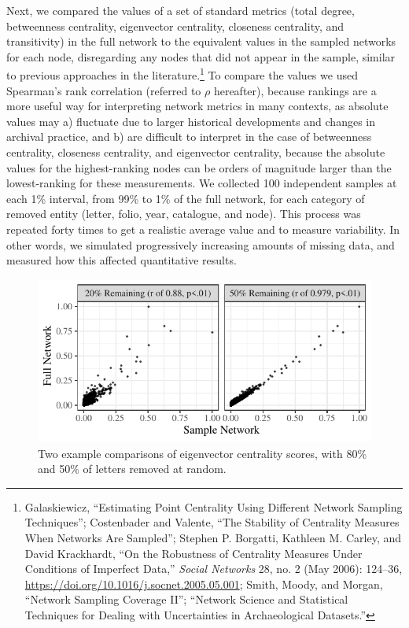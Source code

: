 \documentclass[]{article}
\begin{document}
Next, we compared the values of a set of standard metrics (total degree, betweenness centrality, eigenvector centrality, closeness centrality, and transitivity) in the full network to the equivalent values in the sampled networks for each node, disregarding any nodes that did not appear in the sample, similar to previous approaches in the literature.\footnote{Galaskiewicz, ``Estimating Point Centrality Using Different Network Sampling Techniques''; Costenbader and Valente, ``The Stability of Centrality Measures When Networks Are Sampled''; Stephen P. Borgatti, Kathleen M. Carley, and David Krackhardt, ``On the Robustness of Centrality Measures Under Conditions of Imperfect Data,'' \emph{Social Networks} 28, no. 2 (May 2006): 124--36, \url{https://doi.org/10.1016/j.socnet.2005.05.001}; Smith, Moody, and Morgan, ``Network Sampling Coverage II''; ``Network Science and Statistical Techniques for Dealing with Uncertainties in Archaeological Datasets.''} To compare the values we used Spearman's rank correlation (referred to \(\rho\) hereafter), because rankings are a more useful way for interpreting network metrics in many contexts, as absolute values may a) fluctuate due to larger historical developments and changes in archival practice, and b) are difficult to interpret in the case of betweenness centrality, closeness centrality, and eigenvector centrality, because the absolute values for the highest-ranking nodes can be orders of magnitude larger than the lowest-ranking for these measurements. We collected 100 independent samples at each 1\% interval, from 99\% to 1\% of the full network, for each category of removed entity (letter, folio, year, catalogue, and node). This process was repeated forty times to get a realistic average value and to measure variability. In other words, we simulated progressively increasing amounts of missing data, and measured how this affected quantitative results.

\begin{figure}
\centering
\includegraphics{network_robustness_article_anon_files/figure-latex/example-1.pdf}
\caption{\label{fig:example}Two example comparisons of eigenvector centrality scores, with 80\% and 50\% of letters removed at random.}
\end{figure}
\end{document}
